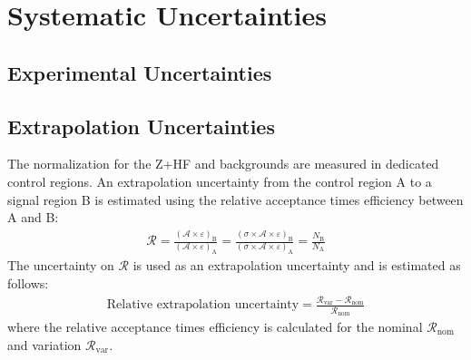 \section{Systematic Uncertainties}


\subsection{Experimental Uncertainties}





\subsection{Extrapolation Uncertainties}

The normalization for the Z+HF and \ttbar backgrounds are measured in dedicated
control regions. An extrapolation uncertainty from the control region A to a
signal region B is estimated using the relative acceptance times efficiency between A and B:
\begin{align*}
  \mathcal{R} = \frac{ \left( \mathcal{A} \times \varepsilon \right)_\text{B}}{\left( \mathcal{A} \times \varepsilon \right)_\text{A}} = \frac{ \left( \sigma \times \mathcal{A} \times \varepsilon \right)_\text{B}}{\left( \sigma \times \mathcal{A} \times \varepsilon \right)_\text{A}} = \frac{N_\text{B}}{N_\text{A}}
\end{align*}
The uncertainty on $\mathcal{R}$ is used as an extrapolation uncertainty and is
estimated as follows:
\begin{align*}
  \text{Relative extrapolation uncertainty} = \frac{\mathcal{R}_\text{var} - \mathcal{R}_\text{nom}}{\mathcal{R}_\text{nom}}
\end{align*}
where the relative acceptance times efficiency is calculated for the nominal
$\mathcal{R}_\text{nom}$ and variation $\mathcal{R}_\text{var}$.







